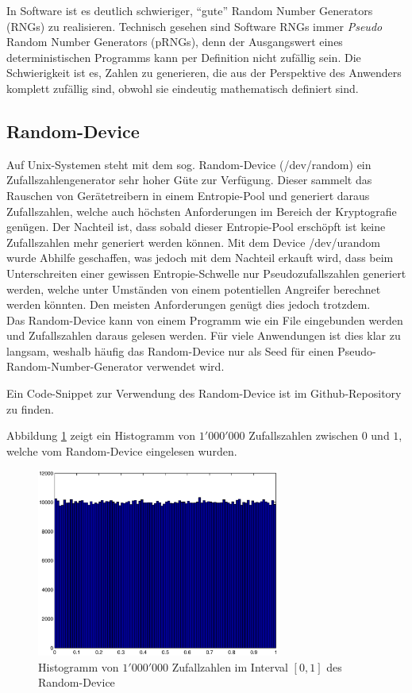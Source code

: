 \documentclass{book}
\begin{document}
\begin{refsection}
In Software ist es deutlich schwieriger, ``gute'' Random Number Generators (RNGs) zu realisieren. Technisch gesehen sind Software RNGs immer \textit{Pseudo} Random Number Generators (pRNGs),  denn der Ausgangswert eines deterministischen Programms kann per Definition nicht zufällig sein. Die Schwierigkeit ist es, Zahlen zu generieren, die aus der Perspektive des Anwenders komplett zufällig sind, obwohl sie eindeutig mathematisch definiert sind.

\newpage
\subsection{Random-Device} \label{subsec:RandomDev}

Auf Unix-Systemen steht mit dem sog. Random-Device (/dev/random) ein Zufallszahlengenerator sehr hoher Güte zur Verfügung. Dieser sammelt das Rauschen von Gerätetreibern in einem Entropie-Pool und generiert daraus Zufallszahlen, welche auch höchsten Anforderungen im Bereich der Kryptografie genügen. Der Nachteil ist, dass sobald dieser Entropie-Pool erschöpft ist keine Zufallszahlen mehr generiert werden können. Mit dem Device /dev/urandom wurde Abhilfe geschaffen, was jedoch mit dem Nachteil erkauft wird, dass beim Unterschreiten einer gewissen Entropie-Schwelle nur Pseudozufallszahlen generiert werden, welche unter Umständen von einem potentiellen Angreifer berechnet werden könnten. Den meisten Anforderungen genügt dies jedoch trotzdem. \\

Das Random-Device kann von einem Programm wie ein File eingebunden werden und Zufallszahlen daraus gelesen werden. Für viele Anwendungen ist dies klar zu langsam, weshalb häufig das Random-Device nur als Seed für einen Pseudo-Random-Number-Generator verwendet wird.

Ein Code-Snippet zur Verwendung des Random-Device ist im Github-Repository \cite{rng:githubRepo} zu finden.

Abbildung \ref{fig:dev_rand_histogram} zeigt ein Histogramm von $1'000'000$ Zufallszahlen zwischen $0$ und $1$, welche vom Random-Device eingelesen wurden.

\begin{figure}[htbp]
	\centering
	\includegraphics[width=8cm]{images/dev_rand_histogram.eps}
	\caption{Histogramm von $1'000'000$ Zufallzahlen im Interval $[0,1]$ des Random-Device}
	\label{fig:dev_rand_histogram}
\end{figure}


\end{refsection}
\end{document}
